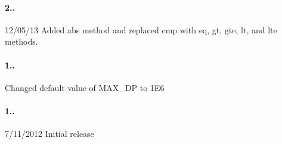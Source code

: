 \paragraph*{2..}


\begin{DoxyItemize}
\item 12/05/13 Added {\ttfamily abs} method and replaced {\ttfamily cmp} with {\ttfamily eq}, {\ttfamily gt}, {\ttfamily gte}, {\ttfamily lt}, and {\ttfamily lte} methods.
\end{DoxyItemize}

\paragraph*{1..}


\begin{DoxyItemize}
\item Changed default value of M\+A\+X\+\_\+\+DP to 1\+E6
\end{DoxyItemize}

\paragraph*{1..}


\begin{DoxyItemize}
\item 7/11/2012 Initial release 
\end{DoxyItemize}